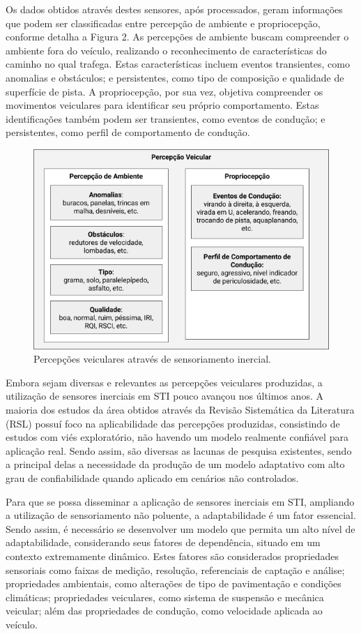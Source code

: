 Os dados obtidos através destes sensores, após processados, geram informações que podem ser classificadas entre percepção de ambiente e propriocepção, conforme detalha a Figura 2. As percepções de ambiente buscam compreender o ambiente fora do veículo, realizando o reconhecimento de características do caminho no qual trafega. Estas características incluem eventos transientes, como anomalias e obstáculos; e persistentes, como tipo de composição e qualidade de superfície de pista. A propriocepção, por sua vez, objetiva compreender os movimentos veiculares para identificar seu próprio comportamento. Estas identificações também podem ser transientes, como eventos de condução; e persistentes, como perfil de comportamento de condução.

\begin{figure}[t]
  \centering
  \caption{Percepções veiculares através de sensoriamento inercial.}
  \label{fig:classificacao_sensores}
  \includegraphics[width=0.9\linewidth]{figuras/fig1_1.png}
\end{figure}

Embora sejam diversas e relevantes as percepções veiculares produzidas, a utilização de sensores inerciais em STI pouco avançou nos últimos anos. A maioria dos estudos da área obtidos através da Revisão Sistemática da Literatura (RSL) possuí foco na aplicabilidade das percepções produzidas, consistindo de estudos com viés exploratório, não havendo um modelo realmente confiável para aplicação real. Sendo assim, são diversas as lacunas de pesquisa existentes, sendo a principal delas a necessidade da produção de um modelo adaptativo com alto grau de confiabilidade quando aplicado em cenários não controlados.

Para que se possa disseminar a aplicação de sensores inerciais em STI, ampliando a utilização de sensoriamento não poluente, a adaptabilidade é um fator essencial. Sendo assim, é necessário se desenvolver um modelo que permita um alto nível de adaptabilidade, considerando seus fatores de dependência, situado em um contexto extremamente dinâmico. Estes fatores são considerados propriedades sensoriais como faixas de medição, resolução, referenciais de captação e análise; propriedades ambientais, como alterações de tipo de pavimentação e condições climáticas; propriedades veiculares, como sistema de suspensão e mecânica veicular; além das propriedades de condução, como velocidade aplicada ao veículo.


